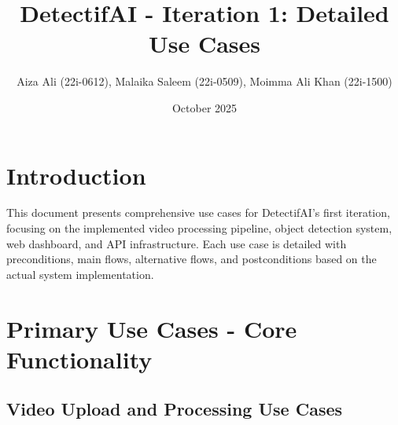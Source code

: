 \documentclass{article}
\title{DetectifAI - Iteration 1: Detailed Use Cases}
\author{Aiza Ali (22i-0612), Malaika Saleem (22i-0509), Moimma Ali Khan (22i-1500)}
\date{October 2025}
\begin{document}
\maketitle

\section{Introduction}

This document presents comprehensive use cases for DetectifAI's first iteration, focusing on the implemented video processing pipeline, object detection system, web dashboard, and API infrastructure. Each use case is detailed with preconditions, main flows, alternative flows, and postconditions based on the actual system implementation.

\section{Primary Use Cases - Core Functionality}

\subsection{Video Upload and Processing Use Cases}
\end{document}
